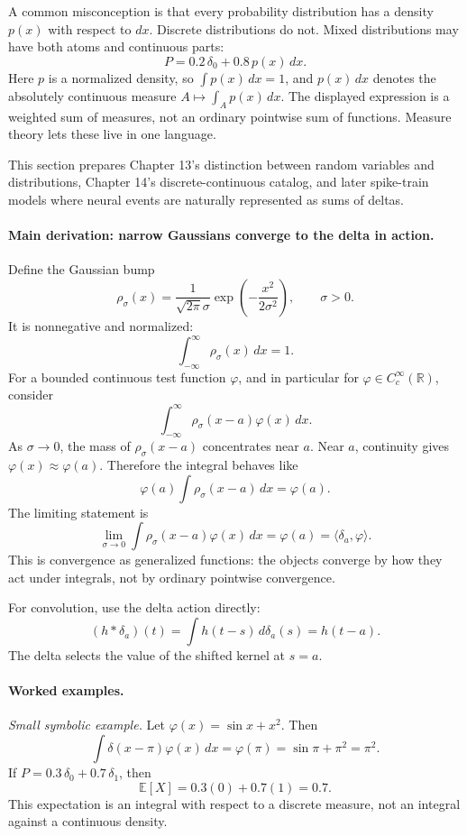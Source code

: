 A common misconception is that every probability distribution has a density \(p(x)\) with respect to \(dx\). Discrete distributions do not. Mixed distributions may have both atoms and continuous parts:
\[
P=0.2\,\delta_0+0.8\,p(x)\,dx.
\]
Here \(p\) is a normalized density, so \(\int p(x)\,dx=1\), and \(p(x)\,dx\) denotes the absolutely continuous measure \(A\mapsto\int_A p(x)\,dx\). The displayed expression is a weighted sum of measures, not an ordinary pointwise sum of functions. Measure theory lets these live in one language.

This section prepares Chapter 13's distinction between random variables and distributions, Chapter 14's discrete-continuous catalog, and later spike-train models where neural events are naturally represented as sums of deltas.

\paragraph{Main derivation: narrow Gaussians converge to the delta in action.}
Define the Gaussian bump
\[
\rho_\sigma(x)=\frac{1}{\sqrt{2\pi}\sigma}
\exp\!\left(-\frac{x^2}{2\sigma^2}\right),
\qquad \sigma>0.
\]
It is nonnegative and normalized:
\[
\int_{-\infty}^{\infty}\rho_\sigma(x)\,dx=1.
\]
For a bounded continuous test function \(\varphi\), and in particular for \(\varphi\in C_c^\infty(\mathbb{R})\), consider
\[
\int_{-\infty}^{\infty}\rho_\sigma(x-a)\varphi(x)\,dx.
\]
As \(\sigma\to0\), the mass of \(\rho_\sigma(x-a)\) concentrates near \(a\). Near \(a\), continuity gives \(\varphi(x)\approx\varphi(a)\). Therefore the integral behaves like
\[
\varphi(a)\int \rho_\sigma(x-a)\,dx=\varphi(a).
\]
The limiting statement is
\[
\lim_{\sigma\to0}\int \rho_\sigma(x-a)\varphi(x)\,dx
=
\varphi(a)
=
\langle\delta_a,\varphi\rangle.
\]
This is convergence as generalized functions: the objects converge by how they act under integrals, not by ordinary pointwise convergence.

For convolution, use the delta action directly:
\[
(h*\delta_a)(t)
=
\int h(t-s)\,d\delta_a(s)
=
h(t-a).
\]
The delta selects the value of the shifted kernel at \(s=a\).

\paragraph{Worked examples.}
\emph{Small symbolic example.} Let \(\varphi(x)=\sin x+x^2\). Then
\[
\int \delta(x-\pi)\varphi(x)\,dx
=
\varphi(\pi)
=
\sin\pi+\pi^2
=
\pi^2.
\]
If \(P=0.3\,\delta_0+0.7\,\delta_1\), then
\[
\mathbb{E}[X]=0.3(0)+0.7(1)=0.7.
\]
This expectation is an integral with respect to a discrete measure, not an integral against a continuous density.


